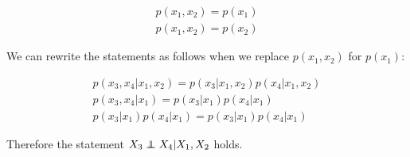 \documentclass[a4paper]{article}
\newcommand\independent{\protect\mathpalette{\protect\independenT}{\perp}}
\def\independenT#1#2{\mathrel{\rlap{$#1#2$}\mkern2mu{#1#2}}}
\begin{document}
\begin{align*}
	p(x_1,x_2) = p(x_1)\\
	p(x_1,x_2) = p(x_2)
\end{align*}

We can rewrite the statements as follows when we replace $p(x_1,x_2)$ for $p(x_1)$:

\begin{align*}
p(x_3, x_4 | x_1, x_2) = p(x_3 | x_1, x_2)p(x_4 | x_1, x_2)\\
p(x_3,x_4|x_1) = p(x_3|x_1)p(x_4|x_1)\\
p(x_3|x_1)p(x_4|x_1) = p(x_3|x_1)p(x_4|x_1)
\end{align*}

Therefore the statement $X_3 \independent X_4 | X_1,X_2$ holds.
\end{document}
